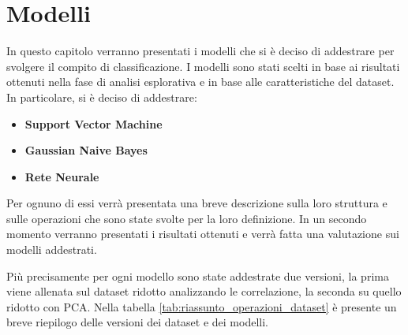 \chapter{Modelli} \label{ch:modelli}
In questo capitolo verranno presentati i modelli che si è deciso di addestrare
per svolgere il compito di classificazione. I modelli sono stati scelti in base
ai risultati ottenuti nella fase di analisi esplorativa e in base alle
caratteristiche del dataset. In particolare, si è deciso di addestrare:
\begin{itemize}
    \item \textbf{Support Vector Machine}
    \item \textbf{Gaussian Naive Bayes}
    \item \textbf{Rete Neurale}
\end{itemize}
Per ognuno di essi verrà presentata una breve descrizione sulla loro struttura
e sulle operazioni che sono state svolte per la loro definizione. In un secondo
momento verranno presentati i risultati ottenuti e verrà fatta una valutazione
sui modelli addestrati.

Più precisamente per ogni modello sono state addestrate due versioni, la prima
viene allenata sul dataset ridotto analizzando le correlazione, la seconda
su quello ridotto con PCA. Nella tabella \ref{tab:riassunto_operazioni_dataset} è
presente un breve riepilogo delle versioni dei dataset e dei modelli.

